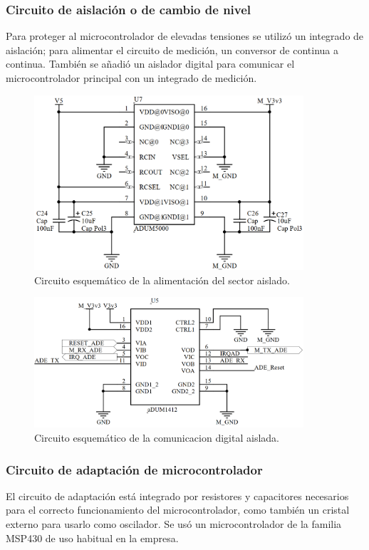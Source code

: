 \subsubsection{Circuito de aislación o de cambio de nivel}
Para proteger al microcontrolador de elevadas tensiones se utilizó un integrado de aislación; para alimentar el circuito de medición, un conversor de continua a continua. También se añadió un aislador digital para comunicar el microcontrolador principal con un integrado de medición.

\begin{figure}[!htb]
	\centering
	\includegraphics[width=100mm,keepaspectratio]{Figures/alimentacion2.png}
	\caption{Circuito esquemático de la alimentación del sector aislado.}
	\label{fig:circaisl1}
\end{figure}

\begin{figure}[!htb]
	\centering
	\includegraphics[width=100mm,keepaspectratio]{Figures/comaislado1.png}
	\caption{Circuito esquemático de la comunicacion digital aislada.}
	\label{fig:circaisl2}
\end{figure}

 
\subsubsection{Circuito de adaptación de microcontrolador}

El circuito de adaptación está integrado por resistores y capacitores necesarios para el correcto funcionamiento del microcontrolador, como también un cristal externo para usarlo como oscilador. Se usó un microcontrolador de la familia MSP430 de uso habitual en la empresa. 


